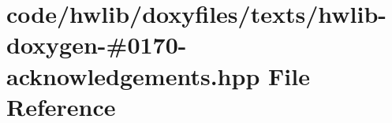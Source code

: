 \hypertarget{hwlib-doxygen-#0170-acknowledgements_8hpp}{}\section{code/hwlib/doxyfiles/texts/hwlib-\/doxygen-\/\#0170-\/acknowledgements.hpp File Reference}
\label{hwlib-doxygen-#0170-acknowledgements_8hpp}
